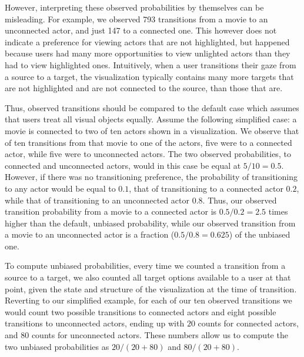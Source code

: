 However, interpreting these observed probabilities by themselves can be misleading. For example, we observed 793 transitions from a movie to an unconnected actor, and just 147 to a connected one. This however does not indicate a preference for viewing actors that are not highlighted, but happened because users had many more opportunities to view unlighted actors than they had to view highlighted ones. Intuitively, when a user transitions their gaze from a source to a target, the visualization typically contains many more targets that are not highlighted and are not connected to the source, than those that are. 

Thus, observed transitions should be compared to the default case which assumes that users treat all visual objects equally. Assume the following simplified case: a movie is connected to two of ten actors shown in a visualization. We observe that of ten transitions from that movie to one of the actors, five were to a connected actor, while five were to unconnected actors. The two observed probabilities, to connected and unconnected actors, would in this case be equal at $5/10 = 0.5$. However, if there was no transitioning preference, the probability of transitioning to any actor would be equal to $0.1$, that of transitioning to a connected actor $0.2$, while that of transitioning to an unconnected actor $0.8$. Thus, our observed transition probability from a movie to a connected actor is $0.5/0.2=2.5$ times higher than the default, unbiased probability, while our observed transition from a movie to an unconnected actor is a fraction ($0.5/0.8=0.625$) of the unbiased one.  

To compute unbiased probabilities, every time we counted a transition from a source to a target, we also counted all target options available to a user at that point, given the state and structure of the visualization at the time of transition. Reverting to our simplified example, for each of our ten observed transitions we would count two possible transitions to connected actors and eight possible transitions to unconnected actors, ending up with $20$ counts for connected actors, and $80$ counts for unconnected actors. These numbers allow us to compute the two unbiased probabilities as $20/(20+80)$ and $80/(20+80)$.



